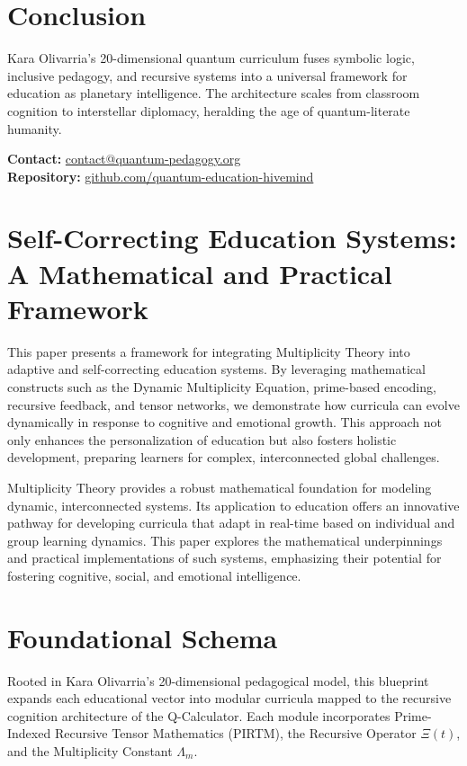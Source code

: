 \documentclass[11pt]{article}
\theoremstyle{plain}
\theoremstyle{definition}
\begin{document}
\section{Conclusion}
Kara Olivarria’s 20-dimensional quantum curriculum fuses symbolic logic, inclusive pedagogy, and recursive systems into a universal framework for education as planetary intelligence. The architecture scales from classroom cognition to interstellar diplomacy, heralding the age of quantum-literate humanity.

\vspace{0.5cm}
\noindent\textbf{Contact:} \href{mailto:contact@quantum-pedagogy.org}{contact@quantum-pedagogy.org} \\
\textbf{Repository:} \href{https://github.com/quantum-education-hivemind}{github.com/quantum-education-hivemind}
\section{Self-Correcting Education Systems: \\ A Mathematical and Practical Framework}


This paper presents a framework for integrating Multiplicity Theory into adaptive and self-correcting education systems. By leveraging mathematical constructs such as the Dynamic Multiplicity Equation, prime-based encoding, recursive feedback, and tensor networks, we demonstrate how curricula can evolve dynamically in response to cognitive and emotional growth. This approach not only enhances the personalization of education but also fosters holistic development, preparing learners for complex, interconnected global challenges.

Multiplicity Theory provides a robust mathematical foundation for modeling dynamic, interconnected systems. Its application to education offers an innovative pathway for developing curricula that adapt in real-time based on individual and group learning dynamics. This paper explores the mathematical underpinnings and practical implementations of such systems, emphasizing their potential for fostering cognitive, social, and emotional intelligence.
\section*{Foundational Schema}
Rooted in Kara Olivarria's 20-dimensional pedagogical model, this blueprint expands each educational vector into modular curricula mapped to the recursive cognition architecture of the Q-Calculator. Each module incorporates Prime-Indexed Recursive Tensor Mathematics (PIRTM), the Recursive Operator $\Xi(t)$, and the Multiplicity Constant $\Lambda_m$.
\end{document}
